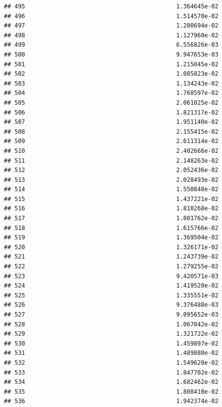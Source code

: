 \documentclass[
]{article}
\begin{document}
\begin{verbatim}
## 495                                           1.364645e-02
## 496                                           1.514570e-02
## 497                                           1.280694e-02
## 498                                           1.127960e-02
## 499                                           6.556826e-03
## 500                                           9.947653e-03
## 501                                           1.215045e-02
## 502                                           1.085823e-02
## 503                                           1.134243e-02
## 504                                           1.768597e-02
## 505                                           2.061025e-02
## 506                                           1.821317e-02
## 507                                           1.951140e-02
## 508                                           2.155415e-02
## 509                                           2.611314e-02
## 510                                           2.402666e-02
## 511                                           2.148263e-02
## 512                                           2.052436e-02
## 513                                           2.028493e-02
## 514                                           1.550848e-02
## 515                                           1.437221e-02
## 516                                           1.810268e-02
## 517                                           1.801762e-02
## 518                                           1.615766e-02
## 519                                           1.369504e-02
## 520                                           1.326171e-02
## 521                                           1.243739e-02
## 522                                           1.279255e-02
## 523                                           9.420571e-03
## 524                                           1.419520e-02
## 525                                           1.335551e-02
## 526                                           9.376488e-03
## 527                                           9.095652e-03
## 528                                           1.067042e-02
## 529                                           1.321722e-02
## 530                                           1.459897e-02
## 531                                           1.489880e-02
## 532                                           1.549620e-02
## 533                                           1.847702e-02
## 534                                           1.682462e-02
## 535                                           1.808410e-02
## 536                                           1.942374e-02

\end{verbatim}
\end{document}
